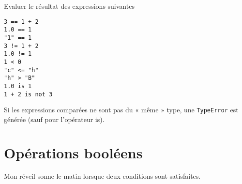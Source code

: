 \documentclass[11pt, a4paper]{book}
\begin{document}
\exo Evaluer le résultat des expressions suivantes
\begin{lstlisting}[numbers=none]
3 == 1 + 2
1.0 == 1 
"1" == 1
3 != 1 + 2
1.0 != 1
1 < 0
"c" <= "h"
"h" > "B"
1.0 is 1 
1 + 2 is not 3
\end{lstlisting}
\begin{important}
	Si les expressions comparées ne sont pas du « même » type, une \lstinline{TypeError} est générée (sauf pour l’opérateur is).	
\end{important}


\section{Opérations  booléens}
Mon réveil sonne le matin lorsque deux conditions sont satisfaites.
\end{document}
